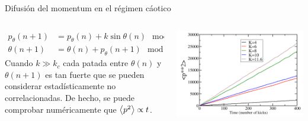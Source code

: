 \documentclass[aspectratio=169,xcolor=dvipsnames,7pt]{beamer}
\begin{document}
\begin{frame}{Difusión del momentum en el régimen cáotico}
	\begin{columns}
		\begin{column}{0.59\textwidth}  %
			\begin{align*}
					p_\theta(n+1) &= p_\theta(n) + k\sin\theta(n)\mod{(2\pi)} \\
					\theta(n+1) &= \theta(n) + p_\theta(n+1)\mod{(2\pi)}
				\end{align*}
			Cuando $k\gg k_c$ cada patada entre $\theta(n)$ y $\theta(n+1)$ 
			es tan fuerte que se pueden
			considerar estadísticamente no correlacionadas. De hecho, se puede comprobar numéricamente que $\expval{p^2}\propto t$.
		\end{column}	
		\begin{column}{0.39\textwidth}
			\includegraphics[width=.9\textwidth]{D}
		\end{column}
	\end{columns}
\end{frame}
\end{document}
